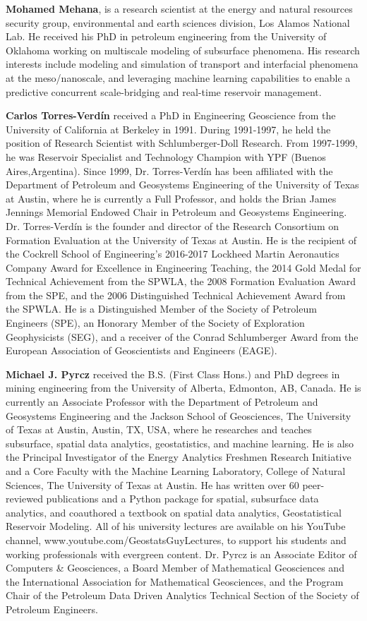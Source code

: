 \documentclass[a4paper,fleqn]{cas-sc}
\begin{document}
\bio{}
{\bf Mohamed Mehana}, is a research scientist at the energy and natural resources security group, environmental and earth sciences division, Los Alamos National Lab. He received his PhD in petroleum engineering from the University of Oklahoma working on multiscale modeling of subsurface phenomena. His research interests include modeling and simulation of transport and interfacial phenomena at the meso/nanoscale, and leveraging machine learning capabilities to enable a predictive concurrent scale-bridging and real-time reservoir management.
\endbio

\bio{}
{\bf Carlos Torres-Verd\'in} received a PhD in Engineering Geoscience from the University of California at Berkeley in 1991. During 1991-1997, he held the position of Research Scientist with Schlumberger-Doll Research. From 1997-1999, he was Reservoir Specialist and Technology Champion with YPF (Buenos Aires,Argentina). Since 1999, Dr. Torres-Verd\'in has been affiliated with the Department of Petroleum and Geosystems Engineering of the University of Texas at Austin, where he is currently a Full Professor, and holds the Brian James Jennings Memorial Endowed Chair in Petroleum and Geosystems Engineering. Dr. Torres-Verd\'in is the founder and director of the Research Consortium on Formation Evaluation at the University of Texas at Austin. He is the recipient of the Cockrell School of Engineering’s 2016-2017 Lockheed Martin Aeronautics Company Award for Excellence in Engineering Teaching, the 2014 Gold Medal for Technical Achievement from the SPWLA, the 2008 Formation Evaluation Award from the SPE, and the 2006 Distinguished Technical Achievement Award from the SPWLA. He is a Distinguished Member of the Society of Petroleum Engineers (SPE), an Honorary Member of the Society of Exploration Geophysicists (SEG), and a receiver of the Conrad Schlumberger Award from the European Association of Geoscientists and Engineers (EAGE).
\endbio

\bio{}
{\bf Michael J. Pyrcz} received the B.S. (First Class Hons.) and PhD degrees in mining engineering from the University of Alberta, Edmonton, AB, Canada. He is currently an Associate Professor with the Department of Petroleum and Geosystems Engineering and the Jackson School of Geosciences, The University of Texas at Austin, Austin, TX, USA, where he researches and teaches subsurface, spatial data analytics, geostatistics, and machine learning. He is also the Principal Investigator of the Energy Analytics Freshmen Research Initiative and a Core Faculty with the Machine Learning Laboratory, College of Natural Sciences, The University of Texas at Austin. He has written over 60 peer-reviewed publications and a Python package for spatial, subsurface data analytics, and coauthored a textbook on spatial data analytics, Geostatistical Reservoir Modeling. All of his university lectures are available on his YouTube channel, www.youtube.com/GeostatsGuyLectures, to support his students and working professionals with evergreen content. Dr. Pyrcz is an Associate Editor of Computers \& Geosciences, a Board Member of Mathematical Geosciences and the International Association for Mathematical Geosciences, and the Program Chair of the Petroleum Data Driven Analytics Technical Section of the Society of Petroleum Engineers.
\endbio
\end{document}
